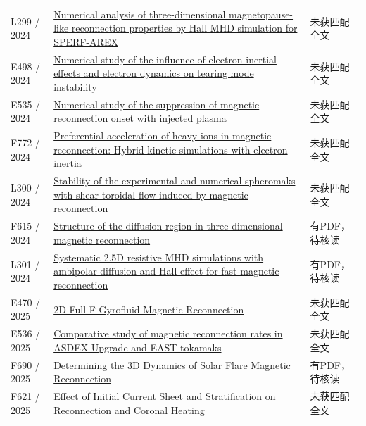 \begin{longtable}{P{24mm}P{97mm}P{27mm}}
L299 / 2024 & \href{https://doi.org/10.1063/5.0213566}{Numerical analysis of three-dimensional magnetopause-like reconnection properties by Hall MHD simulation for SPERF-AREX} & 未获匹配全文\\

E498 / 2024 & \href{https://doi.org/10.1088/1361-6587/ad4e66}{Numerical study of the influence of electron inertial effects and electron dynamics on tearing mode instability} & 未获匹配全文\\

E535 / 2024 & \href{https://doi.org/10.1063/5.0186879}{Numerical study of the suppression of magnetic reconnection onset with injected plasma} & 未获匹配全文\\

F772 / 2024 & \href{https://doi.org/10.1051/0004-6361/202348573}{Preferential acceleration of heavy ions in magnetic reconnection: Hybrid-kinetic simulations with electron inertia} & 未获匹配全文\\

L300 / 2024 & \href{https://doi.org/10.1088/1361-6587/ada1f9}{Stability of the experimental and numerical spheromaks with shear toroidal flow induced by magnetic reconnection} & 未获匹配全文\\

F615 / 2024 & \href{https://doi.org/10.58088/x3fm-h327}{Structure of the diffusion region in three dimensional magnetic reconnection} & 有PDF，待核读\\

L301 / 2024 & \href{https://doi.org/10.1016/j.physleta.2024.129897}{Systematic 2.5D resistive MHD simulations with ambipolar diffusion and Hall effect for fast magnetic reconnection} & 有PDF，待核读\\

E470 / 2025 & \href{https://resolver.obvsg.at/urn:nbn:at:at-ubi:1-175860}{2D Full-F Gyrofluid Magnetic Reconnection} & 未获匹配全文\\

E536 / 2025 & \href{https://doi.org/10.1063/5.0243286}{Comparative study of magnetic reconnection rates in ASDEX Upgrade and EAST tokamaks} & 未获匹配全文\\

F690 / 2025 & \href{https://doi.org/10.3847/1538-4357/ae03c5}{Determining the 3D Dynamics of Solar Flare Magnetic Reconnection} & 有PDF，待核读\\

F621 / 2025 & \href{https://doi.org/10.3847/1538-4357/adfedd}{Effect of Initial Current Sheet and Stratification on Reconnection and Coronal Heating} & 未获匹配全文\\


\end{longtable}
